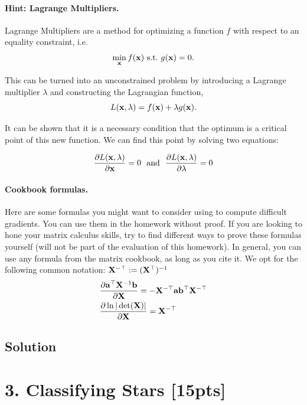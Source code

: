 \documentclass[submit]{harvardml}
\begin{document}
\begin{problem}
\paragraph{Hint: Lagrange Multipliers.} Lagrange Multipliers are a method for
optimizing a function $f$ with respect to an
equality constraint, i.e.
\[\min_{\mathbf{x}} f(\mathbf{x})\ \text{s.t.}\ g(\mathbf{x}) = 0.\]

This can be turned into an unconstrained problem by introducing a
Lagrange multiplier $\lambda$ and constructing the Lagrangian function,
\[L(\mathbf{x}, \lambda) =  f(\mathbf{x}) + \lambda g(\mathbf{x}).\]

It can be shown that it is a necessary condition that the optimum
is a critical point of this new function. We can find this point by solving two equations:

\[\frac{\partial L(\mathbf{x}, \lambda)}{\partial  \mathbf{x}} = 0  \ \ \text{and}\  \  \frac{\partial L(\mathbf{x}, \lambda)}{\partial \lambda} = 0 \]


\paragraph{Cookbook formulas.} Here are some formulas you might want to consider
using to compute difficult gradients. You can use them  in the homework
without proof. If you are looking to hone your matrix calculus skills, try to
find different ways to prove these formulas yourself (will not be part of the
evaluation of this homework). In general, you can use any formula from the matrix cookbook,
as long as you cite it. We opt for the following common notation:
$\mathbf{X}^{-\top} := (\mathbf{X}^{\top})^{-1}$
\begin{align*}
  & \frac{\partial \mathbf{a}^\top \mathbf{X}^{-1} \mathbf{b}}{\partial \mathbf{X}} = - \mathbf{X}^{-\top} \mathbf{a} \mathbf{b}^\top \mathbf{X}^{-\top} \\
  & \frac{\partial \ln | \det (\mathbf{X}) |}{\partial \mathbf{X}} = \mathbf{X}^{-\top}
 \end{align*}
 \end{problem}

\subsection*{Solution}

\newpage


\section*{3. Classifying Stars [15pts]}
\end{document}
